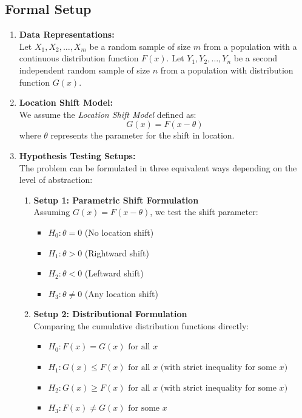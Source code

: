 \documentclass[10pt]{article}
\begin{document}
\subsection{Formal Setup}
\begin{enumerate}
    \item \textbf{Data Representations:} \\
    Let $X_1, X_2, \dots, X_m$ be a random sample of size $m$ from a population with a continuous distribution function $F(x)$. Let $Y_1, Y_2, \dots, Y_n$ be a second independent random sample of size $n$ from a population with distribution function $G(x)$. 
    \item \textbf{Location Shift Model:}\\
    We assume the \textit{Location Shift Model} defined as:
    \[ G(x) = F(x - \theta) \]
    where $\theta$ represents the parameter for the shift in location.
    \item \textbf{Hypothesis Testing Setups:}\\
The problem can be formulated in three equivalent ways depending on the level of abstraction:

\begin{enumerate}
    \item \textbf{Setup 1: Parametric Shift Formulation}\\
    Assuming $G(x) = F(x - \theta)$, we test the shift parameter:
    \begin{itemize}
        \item $H_0: \theta = 0$ (No location shift)
        \item $H_1: \theta > 0$ (Rightward shift)
        \item $H_2: \theta < 0$ (Leftward shift)
        \item $H_3: \theta \neq 0$ (Any location shift)
    \end{itemize}

    \item \textbf{Setup 2: Distributional Formulation}\\
    Comparing the cumulative distribution functions directly:
    \begin{itemize}
        \item $H_0: F(x) = G(x) \text{ for all } x$
        \item $H_1: G(x) \leq F(x) \text{ for all } x \text{ (with strict inequality for some } x)$
        \item $H_2: G(x) \geq F(x) \text{ for all } x \text{ (with strict inequality for some } x)$
        \item $H_3: F(x) \neq G(x) \text{ for some } x$
    \end{itemize}


\end{enumerate}
\end{enumerate}
\end{document}
